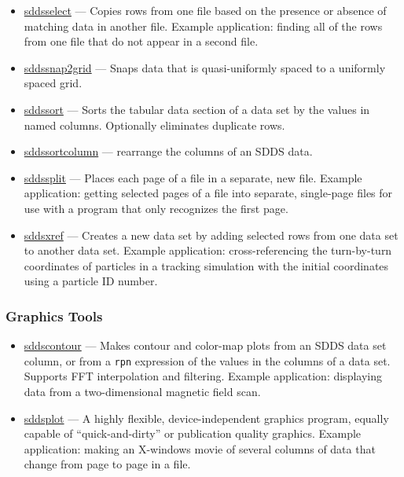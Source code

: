 \documentclass[11pt]{article}
\newcommand{\progref}[1]{\hyperref[#1]{#1}}
\begin{document}
\begin{itemize}
\item \progref{sddsselect} --- Copies rows from one file based on the
presence or absence of matching data in another file.  Example
application: finding all of the rows from one file that do not appear
in a second file.

\item \progref{sddssnap2grid} --- Snaps data that is quasi-uniformly spaced to a uniformly spaced grid.

\item \progref{sddssort} --- Sorts the tabular data section of a data set by the values in named columns.
Optionally eliminates duplicate rows.

\item \progref{sddssortcolumn} --- rearrange the columns of an SDDS data.

\item \progref{sddssplit} --- Places each page of a file in a separate, new file.  Example application: getting
selected pages of a file into separate, single-page files for use with a program that only recognizes the first
page.

\item \progref{sddsxref} --- Creates a new data set by adding selected
rows from one data set to another data set.  Example application:
cross-referencing the turn-by-turn coordinates of particles in a
tracking simulation with the initial coordinates using a particle ID
number.

\end{itemize}

\subsubsection{Graphics Tools}

\begin{itemize}

\item \progref{sddscontour} --- Makes contour and color-map plots from an SDDS data set column, or from a
\verb|rpn| expression of the values in the columns of a data set.  Supports FFT interpolation and filtering.
Example application: displaying data from a two-dimensional magnetic field scan.

\item \progref{sddsplot} --- A highly flexible, device-independent graphics program, equally capable of
``quick-and-dirty'' or publication quality graphics.  Example application: making an X-windows movie of several
columns of data that change from page to page in a file.

\end{itemize}
\end{document}
